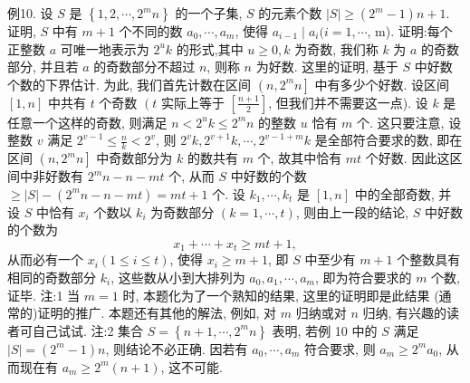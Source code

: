 例10. 设 $S$ 是 $\left\{1,2, \cdots, 2^m n\right\}$ 的一个子集, $S$ 的元素个数 $|S| \geqslant\left(2^m- 1 \right) n+1$. 证明, $S$ 中有 $m+1$ 个不同的数 $a_0, \cdots, a_m$, 使得 $a_{i-1} \mid a_i(i=1, \cdots$, m).
证明:每个正整数 $a$ 可唯一地表示为 $2^u k$ 的形式,其中 $u \geqslant 0, k$ 为奇数, 我们称 $k$ 为 $a$ 的奇数部分, 并且若 $a$ 的奇数部分不超过 $n$, 则称 $n$ 为好数.
这里的证明, 基于 $S$ 中好数个数的下界估计.
为此, 我们首先计数在区间 $\left(n, 2^m n\right]$ 中有多少个好数.
设区间 $[1, n]$ 中共有 $t$ 个奇数 $\left(t\right.$ 实际上等于 $\left[\frac{n+1}{2}\right]$, 但我们并不需要这一点). 设 $k$ 是任意一个这样的奇数, 则满足 $n<2^u k \leqslant 2^m n$ 的整数 $u$ 恰有 $m$ 个.
这只要注意, 设整数 $v$ 满足 $2^{v-1} \leqslant \frac{n}{k}<2^v$, 则 $2^v k, 2^{v+1} k, \cdots, 2^{v-1+m} k$ 是全部符合要求的数, 即在区间 $\left(n, 2^m n\right]$ 中奇数部分为 $k$ 的数共有 $m$ 个, 故其中恰有 $m t$ 个好数.
因此这区间中非好数有 $2^m n-n-m t$ 个, 从而 $S$ 中好数的个数 $\geqslant|S|-\left(2^m n-n-m t\right)=m t+1$ 个.
设 $k_1, \cdots, k_t$ 是 $[1, n]$ 中的全部奇数, 并设 $S$ 中恰有 $x_i$ 个数以 $k_i$ 为奇数部分 $(k=1, \cdots, t)$, 则由上一段的结论, $S$ 中好数的个数为
$$
x_1+\cdots+x_t \geqslant m t+1,
$$
从而必有一个 $x_i(1 \leqslant i \leqslant t)$, 使得 $x_i \geqslant m+1$, 即 $S$ 中至少有 $m+1$ 个整数具有相同的奇数部分 $k_i$, 这些数从小到大排列为 $a_0, a_1, \cdots, a_m$, 即为符合要求的 $m$ 个数, 证毕.
注:1 当 $m=1$ 时, 本题化为了一个熟知的结果, 这里的证明即是此结果 (通常的)证明的推广.
本题还有其他的解法, 例如, 对 $m$ 归纳或对 $n$ 归纳, 有兴趣的读者可自己试试.
注:2 集合 $S=\left\{n+1, \cdots, 2^m n\right\}$ 表明, 若例 10 中的 $S$ 满足 $|S|= \left(2^m-1\right) n$, 则结论不必正确.
因若有 $a_0, \cdots, a_m$ 符合要求, 则 $a_m \geqslant 2^m a_0$, 从而现在有 $a_m \geqslant 2^m(n+1)$, 这不可能.



